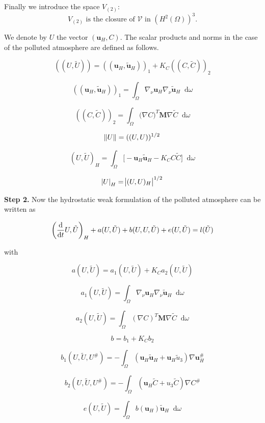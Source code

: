 \documentclass[11pt]{article}
\newcommand*\diff{\mathop{}\!\mathrm{d}}
\begin{document}
Finally we introduce the space $V_{(2)}:$
$$ V_{(2)} \text{ is the closure of } \mathcal{V} \text{ in } (H^2(\Omega))^3.$$

We denote by $U$ the vector $(\mathbf{u}_H, C).$ The scalar products and norms in the case of the polluted atmosphere are defined as follows.

\[ ((U, \tilde{U})) = ((\mathbf{u}_H, \mathbf{\tilde{u}}_H))_1 + K_C ((C, \tilde{C}))_2 \]

\[ ((\mathbf{u}_H, \mathbf{\tilde{u}}_H))_1 = \int_\Omega \nabla_\nu \mathbf{u}_H \nabla_\nu \mathbf{\tilde{u}}_H \diff \omega \]

\[ ((C, \tilde{C}))_2 = \int _\Omega \big  (\nabla C)^T \mathbf{M} \nabla \tilde{C} \diff \omega \]

\[\norm{U} = ((U,U)) ^ {1/2}\]

\[ (U, \tilde{U})_H = \int _\Omega \big [ -\mathbf{u}_H \mathbf{\tilde{u}}_H - K_C C \tilde{C} \big ] \diff \omega \]

\[\abs{U}_H = \abs{(U,U)_H}^{1/2}\]

\textbf{Step 2.} Now the hydrostatic weak formulation of the polluted atmosphere can be written as

\begin{equation} \label{EXISTENCEFORMAT}
  \bigg ( \frac{\diff}{\diff t} U, \tilde{U} \bigg ) _H + a(U, \tilde{U}) + b(U,U,\tilde{U}) + e(U, \tilde{U}) = l(\tilde{U}) \\
\end{equation}

with

\[ a(U,\tilde{U}) = a_1 (U, \tilde{U}) + K_C a_2 (U, \tilde{U})\]

\[ a_1 (U, \tilde{U}) = \int_\Omega \nabla_\nu \mathbf{u}_H \nabla_\nu \mathbf{\tilde{u}}_H \diff \omega \]

\[ a_2 (U, \tilde{U}) = \int_\Omega (\nabla C)^T \mathbf{M} \nabla \tilde{C} \diff \omega \]

\[ b = b_1 + K_C b_2\]

\[ b_1 (U, \tilde{U}, U^\#) = - \int_\Omega (\mathbf{u}_H \mathbf{\tilde{u}}_H + \mathbf{u}_H \tilde{u}_3) \nabla \mathbf{u}_H^\# \]

\[ b_2 (U, \tilde{U}, U^\#) = -  \int_\Omega (\mathbf{u}_H \tilde{C} + u_3 \tilde{C}) \nabla C^\# \]

\[ e(U, \tilde{U}) = \int_\Omega b(\mathbf{u}_H) \mathbf{\tilde{u}}_H \diff \omega \]
\end{document}
